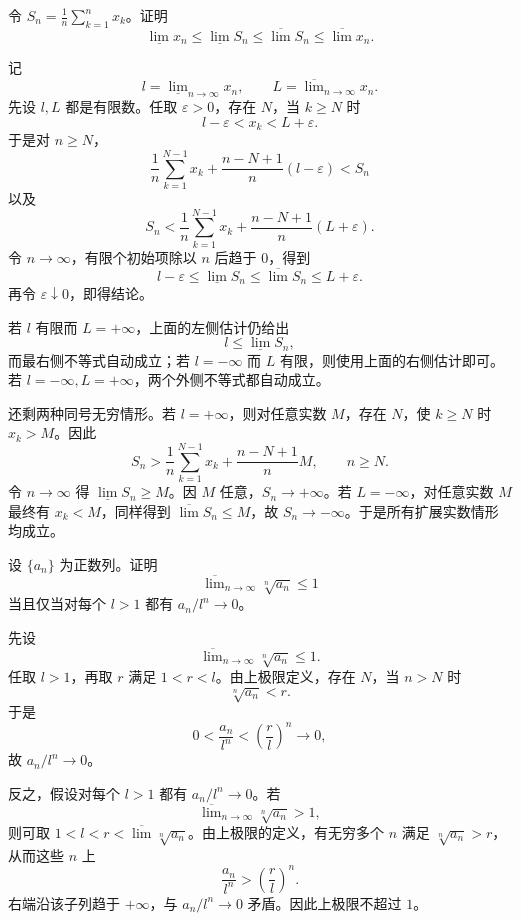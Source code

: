 \begin{xexercise}[3.6.4 练习题 3]
令 $S_n=\frac1n\sum_{k=1}^{n}x_k$。证明
\[
\underline{\lim}x_n\leqslant\underline{\lim}S_n
\leqslant\overline{\lim}S_n\leqslant\overline{\lim}x_n.
\]
\end{xexercise}
\begin{xsolution}
记
\[
  l=\underline{\lim}_{n\to\infty}x_n,
  \qquad
  L=\overline{\lim}_{n\to\infty}x_n.
\]
先设 $l,L$ 都是有限数。任取 $\varepsilon>0$，存在 $N$，当 $k\geqslant N$ 时
\[
  l-\varepsilon<x_k<L+\varepsilon.
\]
于是对 $n\geqslant N$，
\[
  \frac1n\sum_{k=1}^{N-1}x_k
  +\frac{n-N+1}{n}(l-\varepsilon)
  <S_n
\]
以及
\[
  S_n<
  \frac1n\sum_{k=1}^{N-1}x_k
  +\frac{n-N+1}{n}(L+\varepsilon).
\]
令 $n\to\infty$，有限个初始项除以 $n$ 后趋于 $0$，得到
\[
  l-\varepsilon\leqslant\underline{\lim}S_n
  \leqslant\overline{\lim}S_n\leqslant L+\varepsilon.
\]
再令 $\varepsilon\downarrow0$，即得结论。

若 $l$ 有限而 $L=+\infty$，上面的左侧估计仍给出
\[
  l\leqslant\underline{\lim}S_n,
\]
而最右侧不等式自动成立；若 $l=-\infty$ 而 $L$ 有限，则使用上面的右侧估计即可。若 $l=-\infty,L=+\infty$，两个外侧不等式都自动成立。

还剩两种同号无穷情形。若 $l=+\infty$，则对任意实数 $M$，存在 $N$，使 $k\geqslant N$ 时 $x_k>M$。因此
\[
  S_n>
  \frac1n\sum_{k=1}^{N-1}x_k+\frac{n-N+1}{n}M,
  \qquad n\geqslant N.
\]
令 $n\to\infty$ 得 $\underline{\lim}S_n\geqslant M$。因 $M$ 任意，$S_n\to+\infty$。若 $L=-\infty$，对任意实数 $M$ 最终有 $x_k<M$，同样得到 $\overline{\lim}S_n\leqslant M$，故 $S_n\to-\infty$。于是所有扩展实数情形均成立。
\end{xsolution}

\begin{xexercise}[3.6.4 练习题 4]
设 $\{a_n\}$ 为正数列。证明
\[
  \overline{\lim}_{n\to\infty}\sqrt[n]{a_n}\leqslant1
\]
当且仅当对每个 $l>1$ 都有 $a_n/l^n\to0$。
\end{xexercise}
\begin{xsolution}
先设
\[
  \overline{\lim}_{n\to\infty}\sqrt[n]{a_n}\leqslant1.
\]
任取 $l>1$，再取 $r$ 满足 $1<r<l$。由上极限定义，存在 $N$，当 $n>N$ 时
\[
  \sqrt[n]{a_n}<r.
\]
于是
\[
  0<\frac{a_n}{l^n}<\left(\frac rl\right)^n\to0,
\]
故 $a_n/l^n\to0$。

反之，假设对每个 $l>1$ 都有 $a_n/l^n\to0$。若
\[
  \overline{\lim}_{n\to\infty}\sqrt[n]{a_n}>1,
\]
则可取 $1<l<r<\overline{\lim}\sqrt[n]{a_n}$。由上极限的定义，有无穷多个 $n$ 满足 $\sqrt[n]{a_n}>r$，从而这些 $n$ 上
\[
  \frac{a_n}{l^n}>\left(\frac rl\right)^n.
\]
右端沿该子列趋于 $+\infty$，与 $a_n/l^n\to0$ 矛盾。因此上极限不超过 $1$。
\end{xsolution}

